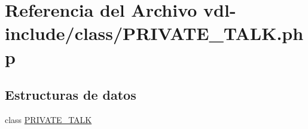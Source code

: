 \hypertarget{PRIVATE__TALK_8php}{\section{Referencia del Archivo vdl-\/include/class/\-P\-R\-I\-V\-A\-T\-E\-\_\-\-T\-A\-L\-K.php}
\label{PRIVATE__TALK_8php}
}
\subsection*{Estructuras de datos}
\begin{DoxyCompactItemize}
\item 
class \hyperlink{classPRIVATE__TALK}{P\-R\-I\-V\-A\-T\-E\-\_\-\-T\-A\-L\-K}
\end{DoxyCompactItemize}
